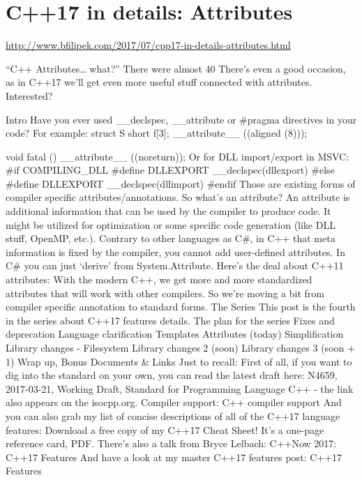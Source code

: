 \section{C++17 in details: Attributes}

\url{http://www.bfilipek.com/2017/07/cpp17-in-details-attributes.html}

“C++ Attributes… what?”
There were almost 40%
There’s even a good occasion, as in C++17 we’ll get even more useful stuff connected with attributes.
Interested?

Intro
Have you ever used __declspec, __attribute or #pragma directives in your code? 
For example:
struct S { short f[3]; } __attribute__ ((aligned (8)));

void fatal () __attribute__ ((noreturn));
Or for DLL import/export in MSVC:
#if COMPILING_DLL
    #define DLLEXPORT __declspec(dllexport)
#else
    #define DLLEXPORT __declspec(dllimport)
#endif
Those are existing forms of compiler specific attributes/annotations. 
So what’s an attribute?
An attribute is additional information that can be used by the compiler to produce code. It might be utilized for optimization or some specific code generation (like DLL stuff, OpenMP, etc.).
Contrary to other languages as C#, in C++ that meta information is fixed by the compiler, you cannot add user-defined attributes. In C# you can just ‘derive’ from System.Attribute.
Here’s the deal about C++11 attributes:
With the modern C++, we get more and more standardized attributes that will work with other compilers. So we’re moving a bit from compiler specific annotation to standard forms.
The Series
This post is the fourth in the series about C++17 features details.
The plan for the series
Fixes and deprecation
Language clarification
Templates
Attributes (today)
Simplification
Library changes - Filesystem
Library changes 2 (soon)
Library changes 3 (soon + 1)
Wrap up, Bonus
Documents & Links
Just to recall:
First of all, if you want to dig into the standard on your own, you can read the latest draft here: 
N4659, 2017-03-21, Working Draft, Standard for Programming Language C++ - the link also appears on the isocpp.org.
Compiler support: C++ compiler support
And you can also grab my list of concise descriptions of all of the C++17 language features:
Download a free copy of my C++17 Cheat Sheet! 
It’s a one-page reference card, PDF.
There’s also a talk from Bryce Lelbach: C++Now 2017: C++17 Features
And have a look at my master C++17 features post: C++17 Features
